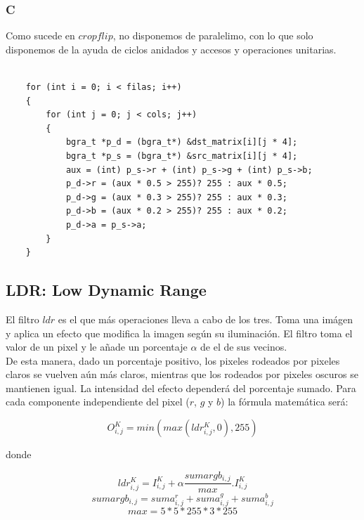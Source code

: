 \subsubsection{C}

Como sucede en $cropflip$, no disponemos de paralelimo, con lo que solo disponemos de la ayuda de ciclos anidados y accesos y operaciones unitarias.

\begin{codesnippet}
\begin{verbatim}

    for (int i = 0; i < filas; i++)
    {
        for (int j = 0; j < cols; j++)
        {
            bgra_t *p_d = (bgra_t*) &dst_matrix[i][j * 4];
            bgra_t *p_s = (bgra_t*) &src_matrix[i][j * 4];
            aux = (int) p_s->r + (int) p_s->g + (int) p_s->b;
            p_d->r = (aux * 0.5 > 255)? 255 : aux * 0.5;
            p_d->g = (aux * 0.3 > 255)? 255 : aux * 0.3;
            p_d->b = (aux * 0.2 > 255)? 255 : aux * 0.2;
            p_d->a = p_s->a;
        }
    }

\end{verbatim}
\end{codesnippet}


\subsection{LDR: Low Dynamic Range}

El filtro $ldr$ es el que más operaciones lleva a cabo de los tres.
Toma una imágen y aplica un efecto que modifica la imagen según su iluminación. El filtro toma el valor de un pixel y le añade un porcentaje $\alpha$ de el de sus vecinos.\\

De esta manera, dado un porcentaje positivo, los pixeles rodeados por pixeles claros se vuelven
aún más claros, mientras que los rodeados por pixeles oscuros se mantienen igual. La intensidad
del efecto dependerá del porcentaje sumado.
Para cada componente independiente del pixel ($r$, $g$ y $b$) la fórmula matemática será:

\begin{center}
$$O_{i,j}^{K} = min(max(ldr_{i,j}^{K},0),255)$$
\end{center}

donde

\begin{center}
$$ldr_{i,j}^{K} = I_{i,j}^{K} + \alpha \frac{sumargb_{i,j}}{max} . I_{i,j}^{K}$$
$$sumargb_{i,j} = suma_{i,j}^{r} + suma_{i,j}^{g} + suma_{i,j}^{b}$$
$$max = 5*5*255*3*255$$
\end{center}

